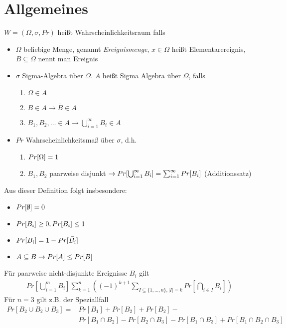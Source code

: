 \section{Allgemeines}
\begin{definition}[Wahrscheinlichkeitsraum]
	$W=(\Omega, \sigma, Pr)$ heißt Wahrscheinlichkeitsraum falls
	\begin{itemize}[noitemsep]
		\item $\Omega$ beliebige Menge, genannt \emph{Ereignismenge}, $x \in \Omega$ heißt Elementarereignis, $B \subseteq \Omega$ nennt man Ereignis
		\item $\sigma$ Sigma-Algebra über $\Omega$. $A$ heißt Sigma Algebra über $\Omega$, falls
		\begin{enumerate}[noitemsep]
			\item $\Omega \in A$
			\item $B \in  A \rightarrow \bar{B} \in A$
			\item $B_1, B_2, \dots \in A \rightarrow \bigcup_{i = 1}^\infty B_i \in A$
		\end{enumerate}
	\item $Pr$ Wahrscheinlichkeitsmaß über $\sigma$, d.h.
	\begin{enumerate}[noitemsep]
		\item $Pr[\Omega] = 1$
		\item $B_1, B_2$ paarweise disjunkt $\rightarrow Pr[\bigcup_{i = 1}^\infty B_i] = \sum_{i=1}^\infty Pr[B_i]$ (Additionssatz)
	\end{enumerate}
	\end{itemize}
	Aus dieser Definition folgt insbesondere:
	\begin{itemize}[noitemsep]
		\item $Pr[\emptyset] = 0$
		\item $Pr[B_i] \geq 0, Pr[B_i] \leq 1 $
		\item $Pr[B_i] = 1 - Pr[\bar{B_i}]$
		\item $A \subseteq B \rightarrow Pr[A] \leq Pr[B]$
	\end{itemize}
\end{definition}

\begin{satz}[Siebformel]
	Für paarweise nicht-disjunkte Ereignisse $B_i$ gilt
	\begin{align*}
		Pr[\bigcup_{i=1}^m B_i] \sum_{k=1}^n ((-1)^{k + 1} \sum_{I \subseteq \{ 1, \dots, n \}, |I| = k } Pr[\bigcap_{i \in I} B_i])
	\end{align*}
	Für $n=3$ gilt z.B. der Speziallfall
	\begin{align*}
		Pr[B_2 \cup B_2 \cup B_3 ] = & Pr[B_1] + Pr[B_2] + Pr[B_2] - \\ & Pr[B_1 \cap B_2] - Pr[B_2 \cap B_3] - Pr[B_1 \cap B_3] + Pr[B_1 \cap B_2 \cap B_3]
	\end{align*}
\end{satz}


